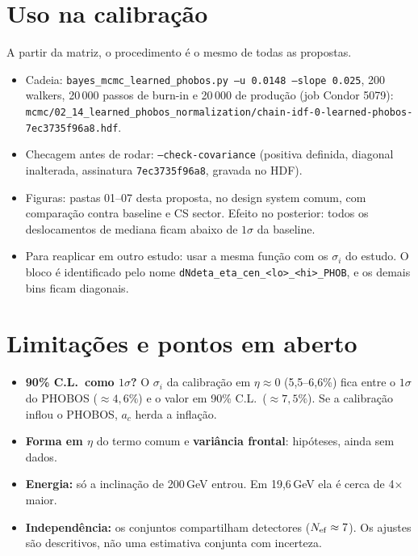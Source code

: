 \documentclass[11pt,a4paper]{article}
\newcommand{\arq}[1]{\texttt{\nolinkurl{#1}}}
\begin{document}
\section{Uso na calibração}
A partir da matriz, o procedimento é o mesmo de todas as propostas.
\begin{itemize}[nosep]
\item Cadeia: \texttt{bayes\_mcmc\_learned\_phobos.py --u 0.0148 --slope 0.025}, 200 walkers, 20\,000 passos de burn-in e
20\,000 de produção (job Condor 5079): \arq{mcmc/02_14_learned_phobos_normalization/chain-idf-0-learned-phobos-7ec3735f96a8.hdf}.
\item Checagem antes de rodar: \texttt{--check-covariance} (positiva definida, diagonal inalterada, assinatura
\texttt{7ec3735f96a8}, gravada no HDF).
\item Figuras: pastas 01--07 desta proposta, no design system comum, com comparação contra baseline e CS sector.
Efeito no posterior: todos os deslocamentos de mediana ficam abaixo de $1\sigma$ da baseline.
\item Para reaplicar em outro estudo: usar a mesma função com os $\sigma_i$ do estudo. O bloco é identificado pelo nome
\texttt{dNdeta\_eta\_cen\_<lo>\_<hi>\_PHOB}, e os demais bins ficam diagonais.
\end{itemize}

\section{Limitações e pontos em aberto}\label{sec:aberto}
\begin{itemize}[nosep]
\item \textbf{90\% C.L.\ como $1\sigma$?} O $\sigma_i$ da calibração em $\eta\approx0$ (5,5--6,6\%) fica entre o $1\sigma$ do PHOBOS
(${\approx}4{,}6\%$) e o valor em 90\% C.L.\ (${\approx}7{,}5\%$). Se a calibração inflou o PHOBOS, $a_c$ herda a inflação.
\item \textbf{Forma em $\eta$} do termo comum e \textbf{variância frontal}: hipóteses, ainda sem dados.
\item \textbf{Energia:} só a inclinação de 200\,GeV entrou. Em 19,6\,GeV ela é cerca de 4$\times$ maior.
\item \textbf{Independência:} os conjuntos compartilham detectores ($N_{\rm ef}\approx7$). Os ajustes são descritivos, não
uma estimativa conjunta com incerteza.
\end{itemize}
\end{document}
